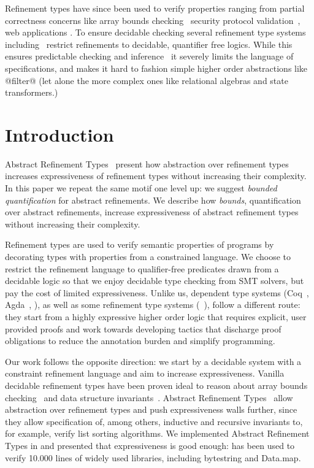 Refinement types have since been used to verify 
properties ranging from partial correctness concerns 
like array bounds checking~\cite{pfenningxi98,LiquidPLDI08} 
security protocol validation~\cite{GordonTOPLAS2011,FournetCCS11}, 
web applications \cite{SwamyOAKLAND11}.
%
To ensure decidable checking several refinement
type systems including~\citep{pfenningxi98,LiquidICFP14}
restrict refinements to decidable, quantifier free logics.
%
While this ensures predictable checking and inference~\cite{LiquidPLDI08} 
it severely limits the language of specifications, and makes it hard to 
fashion simple higher order abstractions like @filter@ (let alone the more
complex ones like relational algebras and state transformers.)


\section{Introduction} \label{sec:intro}

Abstract Refinement Types~\citep{vazou13} present how abstraction over
refinement types increases expressiveness of refinement types
without increasing their complexity.
In this paper we repeat the same motif one level up:
we suggest \emph{bounded quantification} for abstract refinements. 
We describe how \textit{bounds}, \ie quantification over 
abstract refinements, increase expressiveness of abstract refinement types
without increasing their complexity.


Refinement types are used to verify semantic properties of programs
by decorating types with properties from a constrained language.
%
We choose to restrict the refinement language to qualifier-free predicates
drawn from a decidable logic
so that we enjoy decidable type checking from SMT 
solvers, 
but pay the cost of limited expressiveness.
%
Unlike us, dependent type systems (Coq~\citep{coq-book}, Agda~\citep{norell07}, \etc),
as well as some refinement type systems (\fstar~\citep{fstar}),
follow a different route:
they start from a highly expressive higher order logic 
that requires explicit, user provided proofs and work
towards developing tactics that discharge proof obligations to 
reduce the annotation burden and simplify programming.
%

Our work follows the opposite direction: we start by a 
decidable system with a constraint refinement language 
and aim to increase expressiveness.
%
Vanilla decidable refinement types have been proven ideal to reason about 
array bounds checking~\citep{pfenningxi98, LiquidPLDI08} and data
structure invariants~\citep{LiquidPLDI09}.
%
Abstract Refinement Types~\citep{vazou13} allow abstraction over refinement 
types and 
push expressiveness walls further, since they allow specification of, 
among others,
inductive and recursive invariants 
to, for example, verify list sorting algorithms.
%
We implemented Abstract Refinement Types in \toolname 
and presented that expressiveness is good enough:
\toolname has been used to verify 10.000 lines of
widely used \haskell libraries, including bytestring and Data.map.

